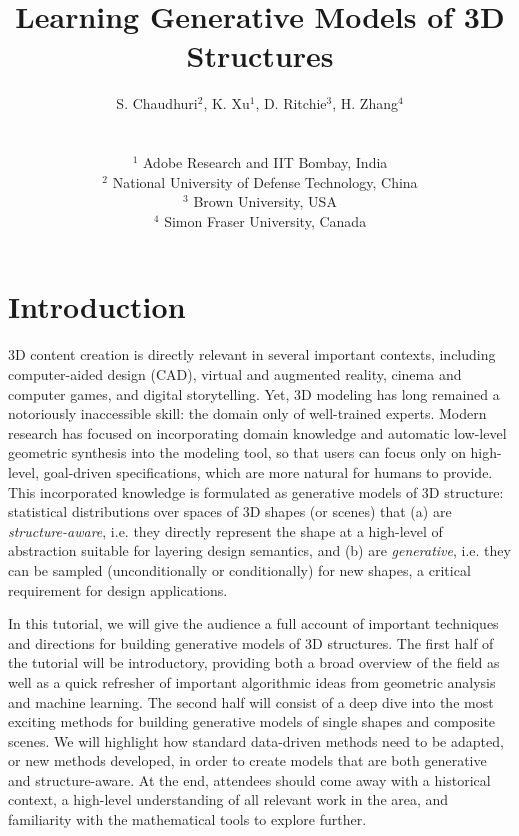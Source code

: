 \documentclass{egpubl}
\title[Learning Generative Models of 3D Structures]%
      {Learning Generative Models of 3D Structures}
\author[S. Chaudhuri \& K. Xu \& D. Ritchie \& H. Zhang]
{\parbox{\textwidth}{\centering S. Chaudhuri$^{2}$\orcid{0000-0001-5923-423X},
        \quad K. Xu$^{1}$\orcid{0000-0001-7756-0901},
        \quad D. Ritchie$^{3}$\orcid{0000-0001-5923-423X},
        \quad H. Zhang$^{4}$\orcid{0000-0001-5923-423X}
        }
        \\
{\parbox{\textwidth}{\centering $^1$ Adobe Research and IIT Bombay, India\\
         $^2$ National University of Defense Technology, China\\
         $^3$ Brown University, USA\\
         $^4$ Simon Fraser University, Canada
       }
}
}
\begin{document}

\maketitle
\section{Introduction}

3D content creation is directly relevant in several important contexts, including computer-aided design (CAD), virtual and augmented reality, cinema and computer games, and digital storytelling. Yet, 3D modeling has long remained a notoriously inaccessible skill: the domain only of well-trained experts. Modern research has focused on incorporating domain knowledge and automatic low-level geometric synthesis into the modeling tool, so that users can focus only on high-level, goal-driven specifications, which are more natural for humans to provide. This incorporated knowledge is formulated as generative models of 3D structure: statistical distributions over spaces of 3D shapes (or scenes) that (a) are \mbox{\em structure-aware}, i.e. they directly represent the shape at a high-level of abstraction suitable for layering design semantics,  and (b) are \mbox{\em generative}, i.e. they can be sampled (unconditionally or conditionally) for new shapes, a critical requirement for design applications.

In this tutorial, we will give the audience a full account of important techniques and directions for building generative models of 3D structures. The first half of the tutorial will be introductory, providing both a broad overview of the field as well as a quick refresher of important algorithmic ideas from geometric analysis and machine learning. The second half will consist of a deep dive into the most exciting methods for building generative models of single shapes and composite scenes. We will highlight how standard data-driven methods need to be adapted, or new methods developed, in order to create models that are both generative and structure-aware. At the end, attendees should come away with a historical context, a high-level understanding of all relevant work in the area, and familiarity with the mathematical tools to explore further.
\end{document}
